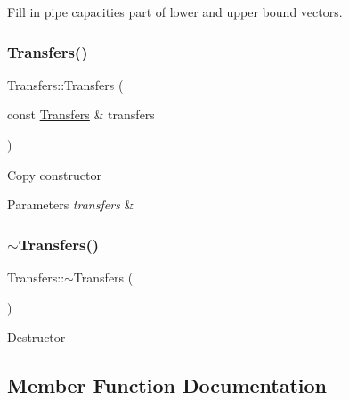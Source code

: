 Fill in pipe capacities part of lower and upper bound vectors. \mbox{\label{classTransfers_af88f7908692240eec9f3179128c6f343}} 
\subsubsection{\texorpdfstring{Transfers()}{Transfers()}\hspace{0.1cm}{\footnotesize\ttfamily [2/2]}}
{\footnotesize\ttfamily Transfers\+::\+Transfers (\begin{DoxyParamCaption}\item[{const \mbox{\hyperlink{classTransfers}{Transfers}} \&}]{transfers }\end{DoxyParamCaption})}

Copy constructor 
\begin{DoxyParams}{Parameters}
{\em transfers} & \\
\hline
\end{DoxyParams}
\mbox{\label{classTransfers_a5dfeafe7a9b9a446b1ab746b65ef3b4b}} 
\subsubsection{\texorpdfstring{$\sim$\+Transfers()}{~Transfers()}}
{\footnotesize\ttfamily Transfers\+::$\sim$\+Transfers (\begin{DoxyParamCaption}{ }\end{DoxyParamCaption})}

Destructor 

\subsection{Member Function Documentation}
\mbox{\label{classTransfers_a3c1930dbeb1273c1c0be93ad5ca57357}} 
